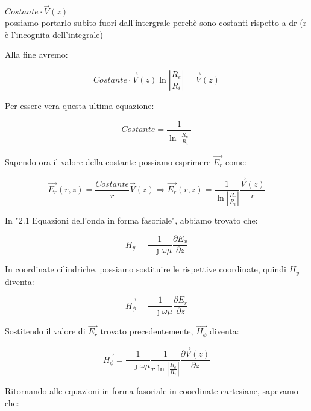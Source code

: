 \begin{tcolorbox}
    $Costante \cdot \vec{V} (z)$ \\ 
    possiamo portarlo subito fuori dall'intergrale perchè 
    sono costanti rispetto a dr (r è l'incognita dell'integrale)   
\end{tcolorbox}

Alla fine avremo: 

{\Large \begin{equation}
    Costante \cdot \vec{V} (z) \ln \left|\frac{R_e}{R_i}\right| = \vec{V} (z)
\end{equation}}

Per essere vera questa ultima equazione: 

{\Large \begin{equation}
    Costante = \frac{1}{\ln \left|\frac{R_e}{R_i}\right|}
\end{equation}}

Sapendo ora il valore della costante possiamo esprimere $\vec{E_r}$ come: 

{\Large \begin{equation}
    \vec{E_r} (r, z) = \frac{Costante}{r} \vec{V} (z) 
    \Rightarrow \vec{E_r} (r, z) = \frac{1}{\ln \left|\frac{R_e}{R_i}\right|}  \frac{\vec{V} (z)}{r}
\end{equation}}

In "2.1 Equazioni dell'onda in forma fasoriale", abbiamo trovato che: 

{\Large \begin{equation}
    H_y = \frac{1}{- \jmath \omega \mu} \frac{\partial E_x}{\partial z}
\end{equation}}

In coordinate cilindriche, possiamo sostituire le rispettive coordinate, 
quindi $H_y$ diventa: 

{\Large \begin{equation}
    \vec{H_\phi} = \frac{1}{- \jmath \omega \mu} \frac{\partial E_r}{\partial z}
\end{equation}}

Sostitendo il valore di $\vec{E_r}$ trovato precedentemente, $\vec{H_\phi}$ diventa: 

{\Large \begin{equation}
    \vec{H_\phi} = \frac{1}{- \jmath \omega \mu} \frac{1}{r \ln \left|\frac{R_e}{R_i}\right| }\frac{\partial \vec{V} (z)}{\partial z}
\end{equation}}

Ritornando alle equazioni in forma fasoriale in coordinate cartesiane, sapevamo che: 

